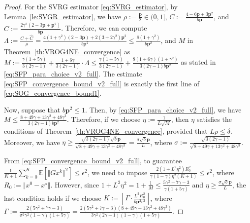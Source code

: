 \documentclass{article}
\newcommand{\norms}[1]{\Vert#1\Vert}
\newcommand{\Exp}[1]{\mathbb{E}\left[#1\right]}
\newcommand{\mbf}[1]{\mathbf{#1}}
\theoremstyle{plain}
\theoremstyle{definition}
\theoremstyle{remark}
\begin{document}
\begin{proof}%
For the SVRG estimator \eqref{eq:SVRG_estimator}, by Lemma~\ref{le:SVGR_estimator}, we have $\rho := \frac{\mbf{p}}{2} \in (0, 1]$, $C := \frac{4-6\mbf{p} + 3\mbf{p}^2 }{b\mbf{p}}$, and $\hat{C} := \frac{2\gamma^2(2 - 3\mbf{p} + \mbf{p}^2)}{b\mbf{p}}$.
Therefore, we can compute $\Lambda := \frac{C+\hat{C}}{\rho} = \frac{4(1+\gamma^2)(2 - 3\mbf{p}) + 2(3+2\gamma^2)\mbf{p}^2}{b\mbf{p}^2} \leq \frac{8(1+\gamma^2)}{b\mbf{p}^2}$, and $M$ in Theorem~\ref{th:VROG4NE_convergence} as $M :=    \frac{\gamma(1+5\gamma)}{3(2\gamma-1)} + \frac{1 + 6\gamma}{3(2\gamma -1) } \cdot \Lambda \leq \frac{\gamma(1+5\gamma)}{3(2\gamma-1)} + \frac{8(1 + 6\gamma)(1+\gamma^2)}{3(2\gamma -1) b\mbf{p}^2 }$ as stated in \eqref{eq:SFP_para_choice_v2_full}.
The estimate \eqref{eq:SFP_convergence_bound_v2_full} is exactly the first line of \eqref{eq:SOG_convergence_bound1}.

Now, suppose that $b\mbf{p}^2 \leq 1$.
Then, by \eqref{eq:SFP_para_choice_v2_full}, we have $M \leq  \frac{8 + 49\gamma + 13\gamma^2 + 48\gamma^3}{3(2\gamma -1) b\mbf{p}^2 }$.
Therefore, if we choose $\eta := \frac{1}{L\sqrt{M}}$, then $\eta$ satisfies the conditions of Theorem~\ref{th:VROG4NE_convergence}, provided that $L\rho \leq \delta$.
Moreover, we have $\eta \geq \frac{\sqrt{3(2\gamma-1)}\sqrt{b}\mbf{p}}{\sqrt{8 + 49\gamma + 13\gamma^2 + 48\gamma^3}} = \frac{\sigma \sqrt{b}\mbf{p}}{L}$, where $\sigma := \frac{\sqrt{3(2\gamma-1)}}{\sqrt{8 + 49\gamma + 13\gamma^2 + 48\gamma^3}}$.

From \eqref{eq:SFP_convergence_bound_v2_full}, to guarantee $\frac{1}{K+1}\sum_{k=0}^K\Exp{\norms{Gx^k}^2} \leq \epsilon^2$, we need to impose $\frac{2(1 + L^2\eta^2)R_0^2}{\gamma(1-\gamma) \eta^2(K+1)} \leq \epsilon^2$, where $R_0 := \norms{x^0 - x^{\star}}$.
However, since $1+ L^2\eta^2 = 1 + \frac{1}{M} \leq \frac{5\gamma^2 + 7\gamma-3}{\gamma(1+5\gamma)}$ and $\eta \geq \frac{\sigma \sqrt{b}\mbf{p}}{ L }$, the last condition holds if we choose $K :=  \left\lfloor \Gamma \cdot \frac{L^2 R_0^2}{ b\mbf{p}^2\epsilon^2} \right\rfloor$, where $\Gamma := \frac{2(5\gamma^2+7\gamma-3)}{\sigma^2\gamma^2(1-\gamma)(1+5\gamma)} = \frac{2(5\gamma^2+7\gamma-3)(8 + 49\gamma + 13\gamma^2 + 48\gamma^3)}{3\gamma^2(2\gamma-1)(1-\gamma)(1+5\gamma)}$.


\end{proof}
\end{document}
